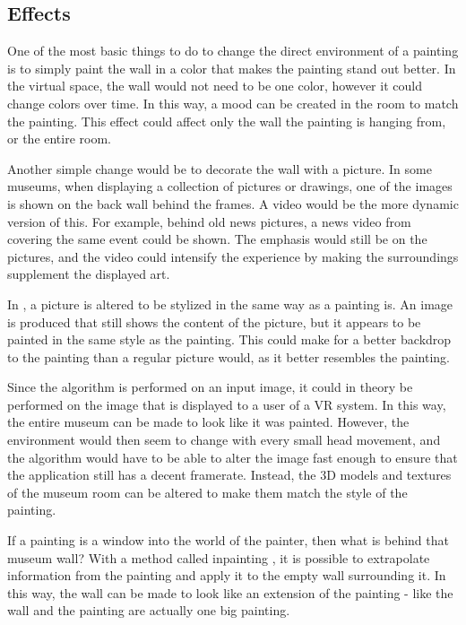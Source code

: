 \documentclass[a4paper]{article}
\begin{document}
\subsection{Effects}

One of the most basic things to do to change the direct environment of a painting is to simply paint the wall in a color that makes the painting stand out better. In the virtual space, the wall would not need to be one color, however it could change colors over time. In this way, a mood can be created in the room to match the painting. This effect could affect only the wall the painting is hanging from, or the entire room. 

Another simple change would be to decorate the wall with a picture. In some museums, when displaying a collection of pictures or drawings, one of the images is shown on the back wall behind the frames. A video would be the more dynamic version of this. For example, behind old news pictures, a news video from covering the same event could be shown. The emphasis would still be on the pictures, and the video could intensify the experience by making the surroundings supplement the displayed art.

In \cite{gatys}, a picture is altered to be stylized in the same way as a painting is. An image is produced that still shows the content of the picture, but it appears to be painted in the same style as the painting. This could make for a better backdrop to the painting than a regular picture would, as it better resembles the painting.

Since the algorithm \cite{gatys} is performed on an input image, it could in theory be performed on the image that is displayed to a user of a VR system. In this way, the entire museum can be made to look like it was painted. However, the environment would then seem to change with every small head movement, and the algorithm would have to be able to alter the image fast enough to ensure that the application still has a decent framerate. Instead, the 3D models and textures of the museum room can be altered to make them match the style of the painting. 

If a painting is a window into the world of the painter, then what is behind that museum wall? With a method called inpainting \cite{inpainting}, it is possible to extrapolate information from the painting and apply it to the empty wall surrounding it. In this way, the wall can be made to look like an extension of the painting - like the wall and the painting are actually one big painting.
\end{document}
